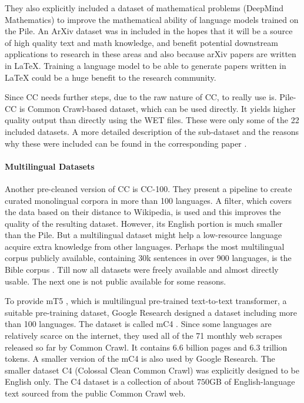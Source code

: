 \documentclass[
]{krantz}
\begin{document}
They also explicitly included a dataset of mathematical problems (DeepMind Mathematics) to improve the mathematical ability of language models trained on the Pile. An ArXiv dataset was in included in the hopes that it will be a source of high quality text and math knowledge, and benefit potential downstream applications to research in these areas and also because arXiv papers are written in LaTeX. Training a language model to be able to generate papers written in LaTeX could be a huge benefit to the research community.

Since CC needs further steps, due to the raw nature of CC, to really use is. Pile-CC is Common Crawl-based dataset, which can be used directly. It yields higher quality output than directly using the WET files.
These were only some of the 22 included datasets. A more detailed description of the sub-dataset and the reasons why these were included can be found in the corresponding paper \citep{gao2020pile}.

\hypertarget{multilingual-datasets}{%
\paragraph{Multilingual Datasets}\label{multilingual-datasets}}

Another pre-cleaned version of CC is CC-100\citep{wenzek2019ccnet}. They present a pipeline to create curated monolingual corpora in more than 100 languages. A filter, which covers the data based on their distance to Wikipedia, is used and this improves the quality of the resulting dataset. However, its English portion is much smaller than the Pile. But a multilingual dataset might help a low-resource language acquire extra knowledge from other languages.
Perhaps the most multilingual corpus publicly available, containing 30k sentences in over 900 languages, is the Bible corpus \citep{mayer2014creating}.
Till now all datasets were freely available and almost directly usable. The next one is not public available for some reasons.

To provide mT5 \citep{xue2020mt5}, which is multilingual pre-trained text-to-text transformer, a suitable pre-training dataset, Google Research designed a dataset including more than 100 languages. The dataset is called mC4 \citep{xue2020mt5}. Since some languages are relatively scarce on the internet, they used all of the 71 monthly web scrapes released so far by Common Crawl. It contains 6.6 billion pages and 6.3 trillion tokens. A smaller version of the mC4 is also used by Google Research. The smaller dataset C4 (Colossal Clean Common Crawl) was explicitly designed to be English only. The C4 dataset is a collection of about \(750\)GB of English-language text sourced from the public Common Crawl web.
\end{document}
